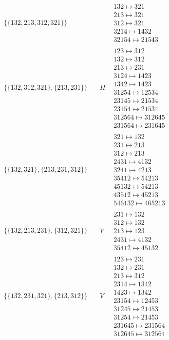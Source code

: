 \begin{tiny}
\begin{align}
\begin{matrix}
\end{matrix}
\\
\{\{132, 213, 312, 321\}\}
\quad
&
\phantom{.}
&
\begin{matrix}
132 \mapsto 321\\213 \mapsto 321\\312 \mapsto 321\\3214 \mapsto 1432\\32154 \mapsto 21543
\end{matrix}
\\
\{\{132, 312, 321\}, \{213, 231\}\}
\quad
&
H
&
\begin{matrix}
123 \mapsto 312\\132 \mapsto 312\\213 \mapsto 231\\3124 \mapsto 1423\\1342 \mapsto 1423\\31254 \mapsto 12534\\23145 \mapsto 21534\\23154 \mapsto 21534\\312564 \mapsto 312645\\231564 \mapsto 231645
\end{matrix}
\\
\{\{132, 321\}, \{213, 231, 312\}\}
\quad
&
\phantom{.}
&
\begin{matrix}
321 \mapsto 132\\231 \mapsto 213\\312 \mapsto 213\\2431 \mapsto 4132\\3241 \mapsto 4213\\35412 \mapsto 54213\\45132 \mapsto 54213\\43512 \mapsto 45213\\546132 \mapsto 465213
\end{matrix}
\\
\{\{132, 213, 231\}, \{312, 321\}\}
\quad
&
V
&
\begin{matrix}
231 \mapsto 132\\312 \mapsto 132\\213 \mapsto 123\\2431 \mapsto 4132\\35412 \mapsto 45132
\end{matrix}
\\
\{\{132, 231, 321\}, \{213, 312\}\}
\quad
&
V
&
\begin{matrix}
123 \mapsto 231\\132 \mapsto 231\\213 \mapsto 312\\2314 \mapsto 1342\\1423 \mapsto 1342\\23154 \mapsto 12453\\31245 \mapsto 21453\\31254 \mapsto 21453\\231645 \mapsto 231564\\312645 \mapsto 312564

\end{matrix}
\end{align}
\end{tiny}

